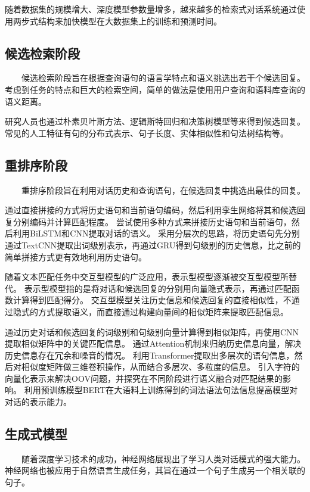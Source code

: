\documentclass{clv3}
\begin{document}
随着数据集的规模增大、深度模型参数量增多，越来越多的检索式对话系统通过使用两步式结构来加快模型在大数据集上的训练和预测时间。

\subsection{候选检索阶段}
$\qquad$候选检索阶段旨在根据查询语句的语言学特点和语义挑选出若干个候选回复。考虑到任务的特点和巨大的检索空间，简单的做法是使用用户查询和语料库查询的语义距离\cite{isbell2006cobot}。

研究人员也通过朴素贝叶斯方法、逻辑斯特回归和决策树模型\cite{song2018an}等来得到候选回复。常见的人工特征有句的分布式表示、句子长度、实体相似性和句法树结构等。

\subsection{重排序阶段}
$\qquad$重排序阶段旨在利用对话历史和查询语句，在候选回复中挑选出最佳的回复。

\cite{lowe2015the}通过直接拼接的方式将历史语句和当前语句编码，然后利用孪生网络将其和候选回复分别编码并计算匹配程度。
\cite{yan2016learning}尝试使用多种方式来拼接历史语句和当前语句，然后利用BiLSTM和CNN提取对话的语义。
\cite{zhou2016multi}采用分层次的思路，将历史语句先分别通过TextCNN提取出词级别表示，再通过GRU得到句级别的历史信息，比之前的简单拼接方式更有效地利用历史语句。

随着文本匹配任务中交互型模型的广泛应用\cite{hu2014convolutional, pang2016text, chen2017enhanced}，表示型模型逐渐被交互型模型所替代。
表示型模型指的是将对话和候选回复的分别用向量隐式表示，再通过匹配函数计算得到匹配得分。
交互型模型关注历史信息和候选回复的直接相似性，不通过隐式的方式提取语义，而直接通过构建向量间的相似矩阵来提取匹配信息。

\cite{wu2017sequential}通过历史对话和候选回复的词级别和句级别向量计算得到相似矩阵，再使用CNN提取相似矩阵中的关键匹配信息。
\cite{zhang2018modeling}通过Attention机制来归纳历史信息向量，解决历史信息存在冗余和噪音的情况。
\cite{zhou2018multi}利用Transformer提取出多层次的语句信息，然后对相似度矩阵做三维卷积操作，从而结合多层次、多粒度的信息。
\cite{tao2019multi}引入字符的向量化表示来解决OOV问题，并探究在不同阶段进行语义融合对匹配结果的影响。
\cite{qu2019bert}利用预训练模型BERT在大语料上训练得到的词法语法句法信息提高模型对对话的表示能力。

\subsection{生成式模型}
\label{generative_model}
$\qquad$随着深度学习技术的成功，神经网络展现出了学习人类对话模式的强大能力\cite{ritter2011data}。神经网络也被应用于自然语言生成任务，其旨在通过一个句子生成另一个相关联的句子。
\end{document}
